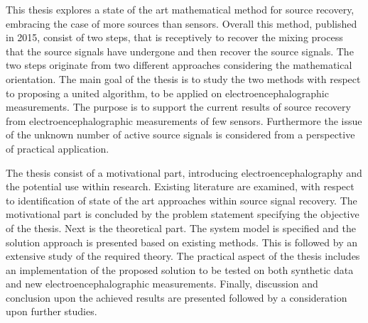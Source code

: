 This thesis explores a state of the art mathematical method for source recovery, embracing the case of more sources than sensors. 
Overall this method, published in 2015, consist of two steps, that is receptively to recover the mixing process that the source signals have undergone and then recover the source signals.
The two steps originate from two different approaches considering the mathematical orientation. 
The main goal of the thesis is to study the two methods with respect to proposing a united algorithm, to be applied on electroencephalographic measurements. The purpose is to support the current results of source recovery from electroencephalographic measurements of few sensors. Furthermore the issue of the unknown number of active source signals is considered from a perspective of practical application.      

The thesis consist of a motivational part, introducing  electroencephalography and the potential use within research. Existing literature are examined, with respect to identification of state of the art approaches within source signal recovery. The motivational part is concluded by the problem statement specifying the objective of the thesis.
Next is the theoretical part. The system model is specified and the solution approach is presented based on existing methods. This is followed by an extensive study of the required theory.   
The practical aspect of the thesis includes an implementation of the proposed solution to be tested on both synthetic data and new electroencephalographic measurements. 
Finally, discussion and conclusion upon the achieved results are presented followed by a consideration upon further studies.    
      





              

